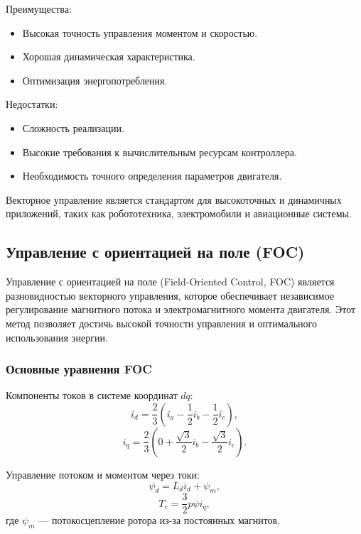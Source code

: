 \documentclass[a4paper,14pt]{extarticle} %
\begin{document}
Преимущества:
\begin{itemize}
\item Высокая точность управления моментом и скоростью.
\item Хорошая динамическая характеристика.
\item Оптимизация энергопотребления.
\end{itemize}

Недостатки:
\begin{itemize}
\item Сложность реализации.
\item Высокие требования к вычислительным ресурсам контроллера.
\item Необходимость точного определения параметров двигателя.
\end{itemize}

Векторное управление является стандартом для высокоточных и динамичных приложений, таких как робототехника, электромобили и авиационные системы.

\subsection*{Управление с ориентацией на поле (FOC)}

Управление с ориентацией на поле (Field-Oriented Control, FOC) является разновидностью векторного управления, которое обеспечивает независимое регулирование магнитного потока и электромагнитного момента двигателя. Этот метод позволяет достичь высокой точности управления и оптимального использования энергии.

\subsubsection*{Основные уравнения FOC}

Компоненты токов в системе координат $dq$:
\begin{equation}
i_d = \frac{2}{3} \left( i_a - \frac{1}{2}i_b - \frac{1}{2}i_c \right),
\end{equation}
\begin{equation}
i_q = \frac{2}{3} \left( 0 + \frac{\sqrt{3}}{2}i_b - \frac{\sqrt{3}}{2}i_c \right).
\end{equation}

Управление потоком и моментом через токи:
\begin{equation}
\psi_d = L_d i_d + \psi_m,
\end{equation}
\begin{equation}
T_e = \frac{3}{2} p \psi i_q,
\end{equation}
где $\psi_m$ — потокосцепление ротора из-за постоянных магнитов.
\end{document}
